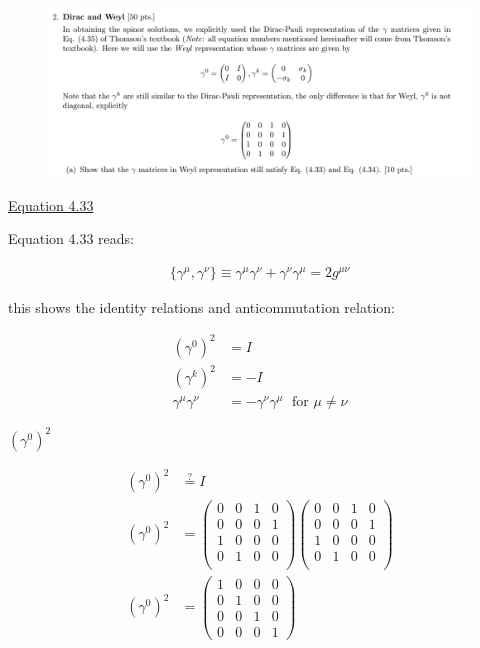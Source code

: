 \documentclass[11pt]{article}
\theoremstyle{definition}
\begin{document}
\begin{figure}[H]
    \centering
    \includegraphics[scale = 0.5]{2a.png}
\end{figure}

\underline{Equation 4.33}

Equation 4.33 reads:

\begin{align*}
    \{\gamma^{\mu},\gamma^{\nu}\} \equiv 
    \gamma^{\mu}\gamma^{\nu} + \gamma^{\nu}\gamma^{\mu}
    =
    2g^{\mu\nu}
    \tag*{(4.33)}
\end{align*}

this shows the identity relations and anticommutation relation:

\begin{align}
    (\gamma^{0})^2 &= I\\
    (\gamma^{k})^2 &= -I\\
    \gamma^{\mu}\gamma^{\nu} &= -\gamma^{\nu}\gamma^{\mu}\;\text{ for } \mu \neq \nu
\end{align}


\underline{\underline{$(\gamma^0)^2$}}

\begin{align}
    (\gamma^0)^2 &\stackrel{?}{=} I\\
    (\gamma^0)^2 &= \begin{pmatrix}
        0 & 0 & 1 & 0\\
        0 & 0 & 0 & 1\\
        1 & 0 & 0 & 0\\
        0 & 1 & 0 & 0\\
    \end{pmatrix}
    \begin{pmatrix}
        0 & 0 & 1 & 0\\
        0 & 0 & 0 & 1\\
        1 & 0 & 0 & 0\\
        0 & 1 & 0 & 0\\
    \end{pmatrix}\\
    (\gamma^0)^2 &=
    \begin{pmatrix}1&0&0&0\\ 0&1&0&0\\ 0&0&1&0\\ 0&0&0&1\end{pmatrix}
\end{align}
\end{document}
